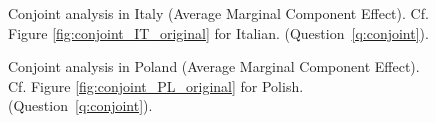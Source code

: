 \begin{figure}[h!]
    \caption[Conjoint analysis in Italy]{Conjoint analysis in Italy (Average Marginal Component Effect). Cf. Figure \ref{fig:conjoint_IT_original} for Italian. \hfill (Question~\ref{q:conjoint}).
    }\label{fig:conjoint_IT}
\end{figure}

\begin{figure}[h!]
    \caption[Conjoint analysis in Poland]{Conjoint analysis in Poland (Average Marginal Component Effect). Cf. Figure \ref{fig:conjoint_PL_original} for Polish. \hfill (Question~\ref{q:conjoint}).
    }\label{fig:conjoint_PL}
\end{figure}

